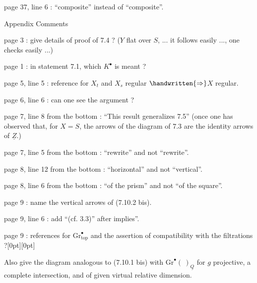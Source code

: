 
page 37, line 6 : ``composite'' instead of ``composite''.

\begin{center}
Appendix Comments
\end{center}

page 3 : give details of proof of 7.4 ? ($Y$ flat over $S$, ... it follows easily ..., one checks easily ...)

page 1 : in statement 7.1, which $K^{\bullet}$ is meant ?

page 5, line 5 : reference for $X_t$ and $X_s$ regular $\handwritten{\Rightarrow}$$X$ regular.

page 6, line 6 : can one see the argument ?

page 7, line 8 from the bottom : ``This result generalizes 7.5'' (once one has observed that, for $X = S$, the arrows of the diagram of 7.3 are the identity arrows of $\underline{Z}$.)

page 7, line 5 from the bottom : ``rewrite'' and not ``rewrite''.

page 8, line 12 from the bottom : ``horizontal'' and not ``vertical''.

page 8, line 6 from the bottom : ``of the prism'' and not ``of the square''.

page 9 : name the vertical arrows of (7.10.2 bis).

page 9, line 6 : add ``(cf. 3.3)'' after implies''.

page 9 : references for $\mathrm{Gr}^{\bullet}_{\mathrm{top}}$ and the assertion of compatibility with the filtrations ?\hspace{0.4em}\raisebox{0.35ex}[0pt][0pt]{\parbox[c]{2mm}{}}

Also give the diagram analogous to (7.10.1 bis) with $\mathrm{Gr}^{\bullet}(\ )_{\underline{Q}}$ for $g$ projective, a complete intersection, and of given virtual relative dimension.

